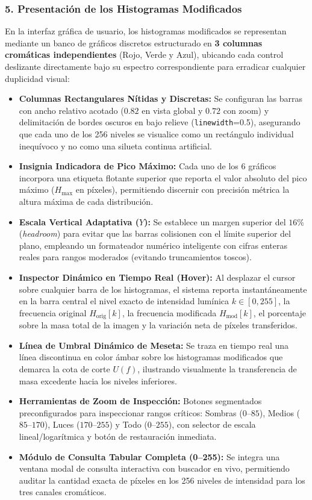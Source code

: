 \documentclass{article}
\begin{document}
\subsubsection{5. Presentación de los Histogramas Modificados}
En la interfaz gráfica de usuario, los histogramas modificados se representan mediante un banco de gráficos discretos estructurado en \textbf{3 columnas cromáticas independientes} (Rojo, Verde y Azul), ubicando cada control deslizante directamente bajo su espectro correspondiente para erradicar cualquier duplicidad visual:
\begin{itemize}
    \item \textbf{Columnas Rectangulares Nítidas y Discretas:} Se configuran las barras con ancho relativo acotado ($0.82$ en vista global y $0.72$ con zoom) y delimitación de bordes oscuros en bajo relieve (\texttt{linewidth}=0.5), asegurando que cada uno de los 256 niveles se visualice como un rectángulo individual inequívoco y no como una silueta continua artificial.
    \item \textbf{Insignia Indicadora de Pico Máximo:} Cada uno de los 6 gráficos incorpora una etiqueta flotante superior que reporta el valor absoluto del pico máximo ($H_{\max}$ en píxeles), permitiendo discernir con precisión métrica la altura máxima de cada distribución.
    \item \textbf{Escala Vertical Adaptativa ($Y$):} Se establece un margen superior del $16\%$ (\textit{headroom}) para evitar que las barras colisionen con el límite superior del plano, empleando un formateador numérico inteligente con cifras enteras reales para rangos moderados (evitando truncamientos toscos).
    \item \textbf{Inspector Dinámico en Tiempo Real (Hover):} Al desplazar el cursor sobre cualquier barra de los histogramas, el sistema reporta instantáneamente en la barra central el nivel exacto de intensidad lumínica $k \in [0, 255]$, la frecuencia original $H_{\text{orig}}[k]$, la frecuencia modificada $H_{\text{mod}}[k]$, el porcentaje sobre la masa total de la imagen y la variación neta de píxeles transferidos.
    \item \textbf{Línea de Umbral Dinámico de Meseta:} Se traza en tiempo real una línea discontinua en color ámbar sobre los histogramas modificados que demarca la cota de corte $U(f)$, ilustrando visualmente la transferencia de masa excedente hacia los niveles inferiores.
    \item \textbf{Herramientas de Zoom de Inspección:} Botones segmentados preconfigurados para inspeccionar rangos críticos: Sombras ($0$--$85$), Medios ($85$--$170$), Luces ($170$--$255$) y Todo ($0$--$255$), con selector de escala lineal/logarítmica y botón de restauración inmediata.
    \item \textbf{Módulo de Consulta Tabular Completa (0--255):} Se integra una ventana modal de consulta interactiva con buscador en vivo, permitiendo auditar la cantidad exacta de píxeles en los 256 niveles de intensidad para los tres canales cromáticos.
\end{itemize}
\end{document}
